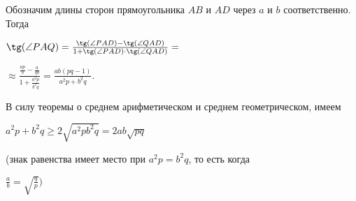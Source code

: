 \begin{minipage}{.5\textwidth}
   \hspace{0.5cm}Обозначим длины сторон прямоугольника $AB$ и $AD$ через $a$ и $b$ соответственно. Тогда 
   
   $\tg(\angle PAQ)=\frac{\tg(\angle PAD)-\tg(\angle QAD)}{1 + \tg(\angle PAD)\cdot\tg(\angle QAD)}=$
   
   \begin{flushright}
        \Large{$\approx\frac{\frac{ap}{b}-\frac{a}{qb}}{1+\frac{a^2p}{b^2q}}=\frac{ab(pq-1)}{a^2p+b^2q}$}.
   \end{flushright}
  В силу теоремы о среднем арифметическом и среднем геометрическом, имеем

  \begin{center}
      $a^2p+b^2q\ge2\sqrt{a^2pb^2q}=2ab\sqrt{pq}$
  \end{center}
  (знак равенства имеет место при $a^2p=b^2q$, то есть когда
  \begin{center}
      \large{$\frac{a}{b}=\sqrt{\frac{q}{p}}\Big)$}
  \end{center}
\end{minipage}

